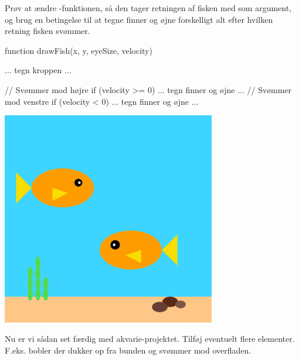 \documentclass{ucph-handout}
\begin{document}
\begin{exercisebox}[adjusted title=Ændre udseende]
Prøv at ændre -funktionen, så den tager retningen af
fisken med som argument, og brug en betingelse til at tegne finner og
øjne forskelligt alt efter hvilken retning fisken svømmer.

\begin{minipage}{0.60\linewidth}

\begin{javascript}
function drawFish(x, y, eyeSize, velocity) {
    ... tegn kroppen ...

    // Svømmer mod højre
    if (velocity >= 0) {
        ... tegn finner og øjne ...
    }
    // Svømmer mod venstre
    if (velocity < 0) {
        ... tegn finner og øjne ...
    }
}
\end{javascript}

\end{minipage}
\begin{minipage}{0.40\linewidth}
\includegraphics[width=0.70\textwidth]{../illustrations/images/fisk-begge-retninger.png}
\end{minipage}
\end{exercisebox}

\begin{exercisebox}[adjusted title=Gør akvarieprojektet færdigt]
Nu er vi sådan set færdig med akvarie-projektet. Tilføj eventuelt
flere elementer. F.eks. bobler der dukker op fra bunden og svømmer mod
overfladen.
\end{exercisebox}
\newpage
\end{document}
